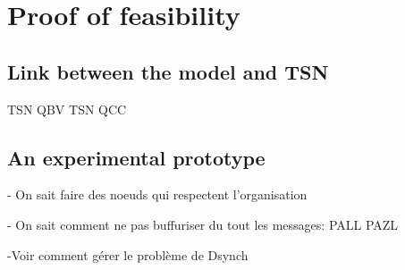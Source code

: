
\chapter{Proof of feasibility}
\label{chap:TSN}
\minitoc



\section{Link between the model and TSN}

 TSN QBV
 TSN QCC
\section{An experimental prototype}
- On sait faire des noeuds qui respectent l'organisation

- On sait comment ne pas buffuriser du tout les messages: PALL PAZL

-Voir comment gérer le problème de Dsynch

